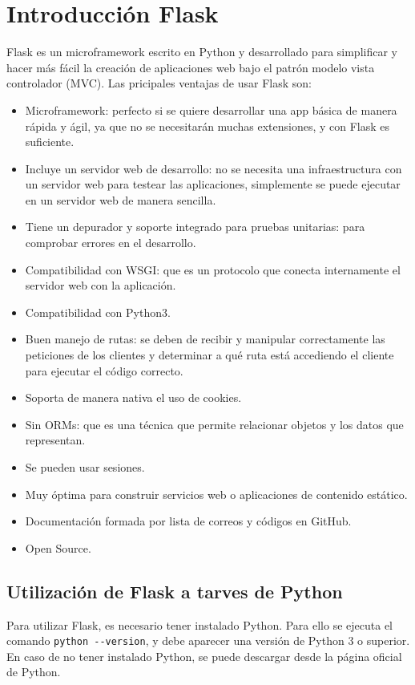\documentclass[10pt]{book}
\begin{document}
\section{Introducción Flask}\cite{openwebinars_flask} \cite{flask_docs}
    Flask es un microframework escrito en Python y desarrollado para simplificar y hacer más fácil la creación de aplicaciones web bajo el patrón modelo vista controlador (MVC). Las pricipales ventajas de usar Flask son:
        \begin{itemize}
            \item Microframework: perfecto si se quiere desarrollar una app básica de manera rápida y ágil, ya que no se necesitarán muchas extensiones, y con Flask es suficiente.
            \item Incluye un servidor web de desarrollo: no se necesita una infraestructura con un servidor web para testear las aplicaciones, simplemente se puede ejecutar en un servidor web de manera sencilla.
            \item Tiene un depurador y soporte integrado para pruebas unitarias: para comprobar errores en el desarrollo.
            \item Compatibilidad con WSGI: que es un protocolo que conecta internamente el servidor web con la aplicación.
            \item Compatibilidad con Python3.
            \item Buen manejo de rutas: se deben de recibir y manipular correctamente las peticiones de los clientes y determinar a qué ruta está accediendo el cliente para ejecutar el código correcto.
            \item Soporta de manera nativa el uso de cookies.
            \item Sin ORMs: que es una técnica que permite relacionar objetos y los datos que representan.
            \item Se pueden usar sesiones.
            \item Muy óptima para construir servicios web o aplicaciones de contenido estático.
            \item Documentación formada por lista de correos y códigos en GitHub.
            \item Open Source.
        \end{itemize}

    \subsection{Utilización de Flask a tarves de Python}
        Para utilizar Flask, es necesario tener instalado Python. Para ello se ejecuta el comando \lstinline{python --version}, y debe aparecer una versión de Python 3 o superior.\\
        En caso de no tener instalado Python, se puede descargar desde la página oficial de Python.
\end{document}
